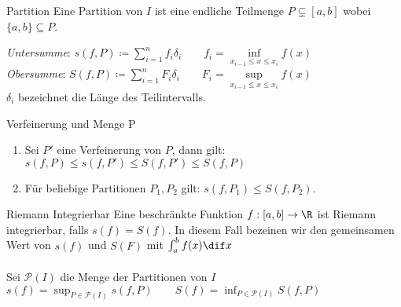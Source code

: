 
\begin{definition}{Partition}
	Eine Partition von $I$ ist eine endliche Teilmenge $P \subsetneq [a,b]$ wobei $\{a,b\} \subseteq P$.
\end{definition}
\noindent\emph{Untersumme}: $s(f,P) \coloneqq \sum_{i=1}^n f_i \delta_i \qquad f_i = \inf\limits_{x_{i-1} \leq x \leq x_i} f(x)$\\
\emph{Obersumme}: $S(f,P) \coloneqq \sum_{i=1}^n F_i \delta_i \qquad F_i = \sup\limits_{x_{i-1} \leq x \leq x_i} f(x)$\\
$\delta_i$ bezeichnet die Länge des Teilintervalls.
\begin{lemma}{Verfeinerung und Menge P}
	\begin{enumerate}
		\item Sei $P'$ eine Verfeinerung von $P$, dann gilt:\\
			$s(f,P) \leq s (f,P') \leq S(f,P') \leq S(f, P)$
		\item Für beliebige Partitionen $P_1, P_2$ gilt: $s(f,P_1) \leq S(f,P_2)$.
	\end{enumerate}
\end{lemma}
\begin{definition}{Riemann Integrierbar}
	Eine beschränkte Funktion $f : [a,b] \to \R$ ist Riemann integrierbar, falls $s(f) = S(f)$. In diesem Fall bezeinen wir den gemeinsamen Wert von $s(f)$ und $S(F)$ mit
    $\int_{a}^{b} f(x) \dif x $\\ \\
	Sei $\mathcal{P}(I)$ die Menge der Partitionen von $I$\\
    $s(f) = \sup_{P \in \mathcal{P}(I)} s(f,P) \qquad S(f) = \inf_{P \in \mathcal{P}(I)} S(f,P)$
\end{definition}
